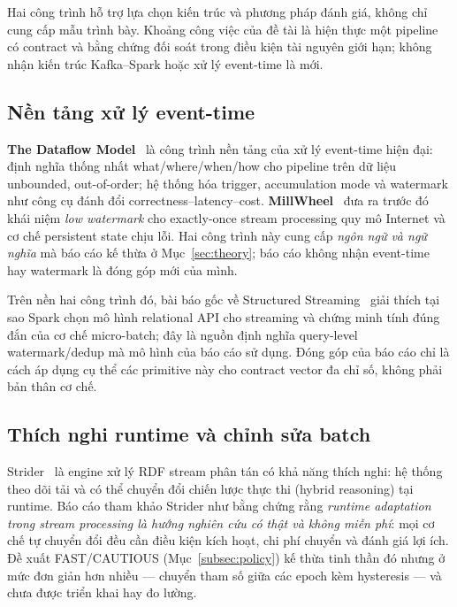 Hai công trình hỗ trợ lựa chọn kiến trúc và phương pháp đánh giá, không
chỉ cung cấp mẫu trình bày. Khoảng công việc của đề tài là hiện thực một
pipeline có contract và bằng chứng đối soát trong điều kiện tài nguyên
giới hạn; không nhận kiến trúc Kafka--Spark hoặc xử lý event-time là mới.

\subsection{Nền tảng xử lý event-time}

\textbf{The Dataflow Model}~\cite{dataflow_model_2015} là công trình nền tảng
của xử lý event-time hiện đại: định nghĩa thống nhất what/where/when/how cho
pipeline trên dữ liệu unbounded, out-of-order; hệ thống hóa trigger,
accumulation mode và watermark như công cụ đánh đổi correctness--latency--cost.
\textbf{MillWheel}~\cite{millwheel_2013} đưa ra trước đó khái niệm
\textit{low watermark} cho exactly-once stream processing quy mô Internet và
cơ chế persistent state chịu lỗi. Hai công trình này cung cấp \emph{ngôn ngữ
và ngữ nghĩa} mà báo cáo kế thừa ở Mục~\ref{sec:theory}; báo cáo không nhận
event-time hay watermark là đóng góp mới của mình.

Trên nền hai công trình đó, bài báo gốc về Structured
Streaming~\cite{structured_streaming_sigmod_2018}
giải thích tại sao Spark chọn mô hình relational API cho streaming và
chứng minh tính đúng đắn của cơ chế micro-batch; đây là nguồn định nghĩa
query-level watermark/dedup mà mô hình của báo cáo sử dụng. Đóng góp của
báo cáo chỉ là cách áp dụng cụ thể các primitive này cho contract vector đa
chỉ số, không phải bản thân cơ chế.

\subsection{Thích nghi runtime và chỉnh sửa batch}

Strider~\cite{strider_iswc_2017} là engine xử lý RDF stream phân tán có khả
năng thích nghi: hệ thống theo dõi tải và có thể chuyển đổi chiến lược thực
thi (hybrid reasoning) tại runtime. Báo cáo tham khảo Strider như bằng chứng
rằng \textit{runtime adaptation trong stream processing là hướng nghiên cứu có
thật và không miễn phí}: mọi cơ chế tự chuyển đổi đều cần điều kiện kích hoạt,
chi phí chuyển và đánh giá lợi ích. Đề xuất FAST/CAUTIOUS
(Mục~\ref{subsec:policy}) kế thừa tinh thần đó nhưng ở mức đơn giản hơn nhiều
--- chuyển tham số giữa các epoch kèm hysteresis --- và chưa được triển khai
hay đo lường.

